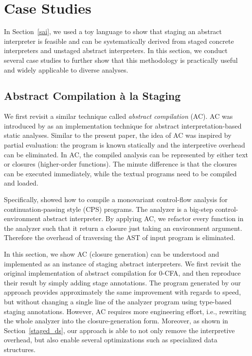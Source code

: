 \section{Case Studies} \label{cases_study}

In Section~\ref{sai}, we used a toy language to show that staging an abstract
interpreter is feasible and can be systematically derived from staged concrete
interpreters and unstaged abstract interpreters.
In this section, we conduct several case studies to further show that this
methodology is practically useful and widely applicable to diverse analyses.

\subsection{Abstract Compilation \`a la Staging} \label{cs_ac}

We first revisit a similar technique called \textit{abstract compilation} (AC).
AC was introduced by \citet{Boucher:1996:ACN:647473.727587} as an
implementation technique for abstract interpretation-based static analyses.
Similar to the present paper, the idea of AC was inspired by partial evaluation:
the program is known statically and the interpretive overhead can be
eliminated. In AC, the compiled analysis can be represented by either text or
closures (higher-order functions). The minute difference is that the closures
can be executed immediately, while the textual programs need to be compiled and
loaded.

Specifically, \citeauthor{Boucher:1996:ACN:647473.727587} showed how to compile a
monovariant control-flow analysis \cite{Shivers:1991:SSC:115865.115884,
Shivers:1988:CFA:53990.54007} for continuation-passing style (CPS) programs.
The analyzer is a big-step control-environment abstract interpreter. 
By applying AC, we refactor every function in the analyzer such that it
return a closure just taking an environment argument.  Therefore the overhead
of traversing the AST of input program is eliminated.

In this section, we show AC (closure generation) can be understood and
implemented as an instance of staging abstract interpreters. We first revisit
the original implementation of abstract compilation for 0-CFA, and then
reproduce their result by simply adding stage annotations.
The program generated by our approach provides approximately the same
improvement with regards to speed, but without changing a single line of the
analyzer program using type-based staging annotations. However, AC requires
more engineering effort, i.e., rewriting the whole analyzer into the
closure-generation form. Moreover, as shown in Section~\ref{staged_ds}, our
approach is able to not only remove the interpretive overhead, but also enable
several optimizations such as specialized data structures.


